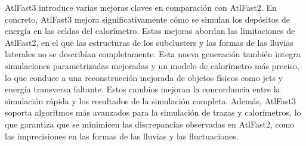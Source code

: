 AtlFast3 introduce varias mejoras claves en comparación con AtlFast2. En concreto, AtlFast3 mejora significativamente cómo se simulan los depósitos de energía en las celdas del calorímetro. Estas mejoras abordan las limitaciones de AtlFast2, en el que las estructuras de los subclusters y las formas de las lluvias laterales no se describían completamente. Esta nueva generación también integra simulaciones parametrizadas mejoradas y un modelo de calorímetro más preciso, lo que conduce a una reconstrucción mejorada de objetos físicos como jets y energía transversa faltante. Estos cambios mejoran la concordancia entre la simulación rápida y los resultados de la simulación completa.
Además, AtlFast3 soporta algoritmos más avanzados para la simulación de trazas y calorímetros, lo que garantiza que se minimicen las discrepancias observadas en AtlFast2, como las imprecisiones en las formas de las lluvias y las fluctuaciones.